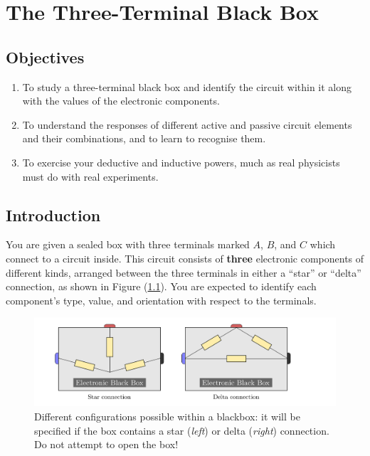 \chapter{The Three-Terminal Black Box}

\section*{Objectives}

\begin{enumerate}
\item To study a three-terminal black box and identify the circuit within it along with the values of the electronic components.

\item To understand the responses of different active and passive circuit elements and their combinations, and to learn to recognise them.

\item To exercise your deductive and inductive powers, much as real physicists must do with real experiments.
\end{enumerate}


\section*{Introduction}

You are given a sealed box with three terminals marked $A$, $B$, and $C$ which connect to a circuit inside. This circuit consists of \textbf{three} electronic components of different kinds, arranged between the three terminals in either a ``star'' or ``delta'' connection, as shown in Figure (\ref{fig:bb}). You are expected to identify each component's type, value, and orientation with respect to the terminals. 

\begin{figure}[!htb]
    \centering
    \includegraphics[scale=0.3]{figs/bb.png}
    \caption{Different configurations possible within a blackbox: it will be specified if the box contains a star (\textit{left}) or delta (\textit{right}) connection. Do not attempt to open the box! }
    \label{fig:bb}
\end{figure}

